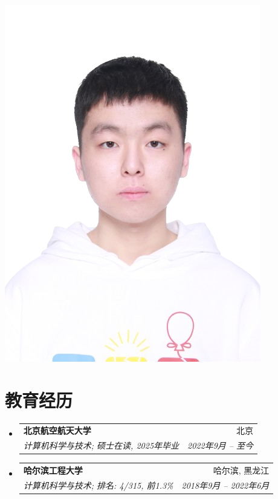 \documentclass[letterpaper,11pt]{article}
\makeatletter
\newcommand{\resumeSubheading}[4]{
  \vspace{-1pt}\item
    \begin{tabular*}{0.97\textwidth}{l@{\extracolsep{\fill}}r}
      \textbf{#1} & #2 \\
      \textit{\small#3} & \textit{ #4} \\
    \end{tabular*}\vspace{-5pt}
}
\newcommand{\resumeSubHeadingListStart}{\begin{itemize}[leftmargin=*]}
\newcommand{\resumeSubHeadingListEnd}{\end{itemize}}
\makeatother
\begin{document}
\begin{minipage}[t]{0.12\textwidth}
    \vspace*{-1cm} %
    \includegraphics[width=\textwidth]{zzqpic-no-bg.png}
\end{minipage}


\vspace{-29pt}
\section{教育经历}
  \resumeSubHeadingListStart
    \resumeSubheading
      {北京航空航天大学}{北京}
      {计算机科学与技术;  硕士在读, 2025年毕业}{2022年9月 -- 至今}
    \resumeSubheading
      {哈尔滨工程大学}{哈尔滨, 黑龙江}
      {计算机科学与技术;  排名: 4/315, 前1.3\%}{2018年9月 -- 2022年6月}
  \resumeSubHeadingListEnd

\vspace{-10pt}
\end{document}
